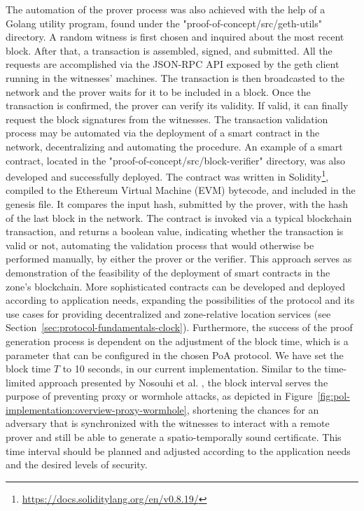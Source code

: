 The automation of the prover process was also achieved with the help of a Golang utility program, found under the "proof-of-concept/src/geth-utils" directory. A random witness is first chosen and inquired about the most recent block. After that, a transaction is assembled, signed, and submitted. All the requests are accomplished via the JSON-RPC API exposed by the geth client running in the witnesses' machines. The transaction is then broadcasted to the network and the prover waits for it to be included in a block. Once the transaction is confirmed, the prover can verify its validity. If valid, it can finally request the block signatures from the witnesses. The transaction validation process may be automated via the deployment of a smart contract in the network, decentralizing and automating the procedure. An example of a smart contract, located in the "proof-of-concept/src/block-verifier" directory, was also developed and successfully deployed. The contract was written in Solidity\footnote{\url{https://docs.soliditylang.org/en/v0.8.19/}}, compiled to the Ethereum Virtual Machine (EVM) bytecode, and included in the genesis file. It compares the input hash, submitted by the prover, with the hash of the last block in the network. The contract is invoked via a typical blockchain transaction, and returns a boolean value, indicating whether the transaction is valid or not, automating the validation process that would otherwise be performed manually, by either the prover or the verifier. This approach serves as demonstration of the feasibility of the deployment of smart contracts in the zone's blockchain. More sophisticated contracts can be developed and deployed according to application needs, expanding the possibilities of the protocol and its use cases for providing decentralized and zone-relative location services (see Section~\ref{sec:protocol-fundamentals-clock}). Furthermore, the success of the proof generation process is dependent on the adjustment of the block time, which is a parameter that can be configured in the chosen PoA protocol. We have set the block time $T$ to 10 seconds, in our current implementation. Similar to the time-limited approach presented by Nosouhi et al. \cite{nosouhi2020blockchain}, the block interval serves the purpose of preventing proxy or wormhole attacks, as depicted in Figure~\ref{fig:pol-implementation:overview-proxy-wormhole}, shortening the chances for an adversary that is synchronized with the witnesses to interact with a remote prover and still be able to generate a spatio-temporally sound \pol{} certificate. This time interval should be planned and adjusted according to the application needs and the desired levels of security.

